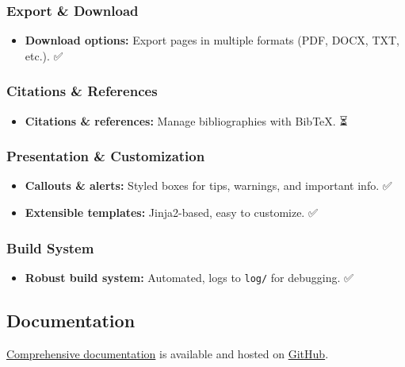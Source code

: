 \subsubsection{Export \& Download}\label{export-download}

\begin{itemize}
\tightlist
\item
  \textbf{Download options:} Export pages in multiple formats (PDF,
  DOCX, TXT, etc.). ✅
\end{itemize}

\subsubsection{Citations \& References}\label{citations-references}

\begin{itemize}
\tightlist
\item
  \textbf{Citations \& references:} Manage bibliographies with BibTeX.
  ⏳
\end{itemize}

\subsubsection{Presentation \&
Customization}\label{presentation-customization}

\begin{itemize}
\tightlist
\item
  \textbf{Callouts \& alerts:} Styled boxes for tips, warnings, and
  important info. ✅
\item
  \textbf{Extensible templates:} Jinja2-based, easy to customize. ✅
\end{itemize}

\subsubsection{Build System}\label{build-system}

\begin{itemize}
\tightlist
\item
  \textbf{Robust build system:} Automated, logs to \texttt{log/} for
  debugging. ✅
\end{itemize}

\subsection{Documentation}\label{documentation}

\href{https://oer-forge.github.io/docs/}{Comprehensive documentation} is
available and hosted on
\href{https://github.com/OER-Forge/docs}{GitHub}.

